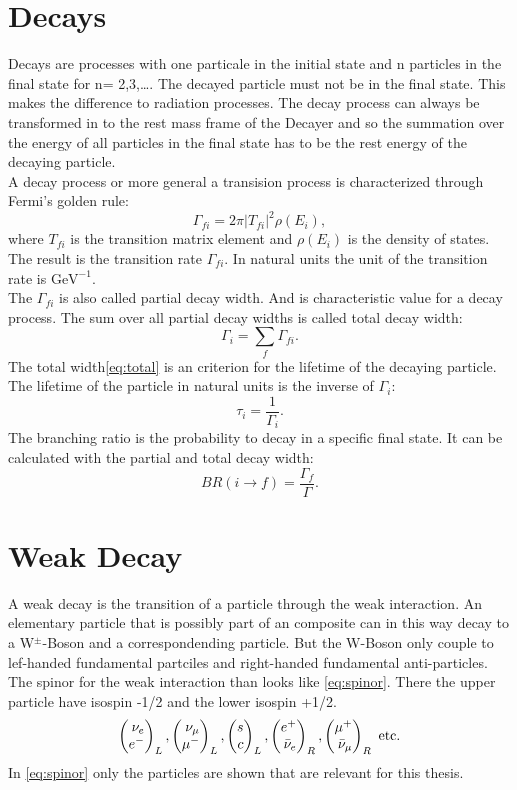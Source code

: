 \section{Decays}
Decays are processes with one particale in the initial state and n particles 
in the final state for n= 2,3,{\ldots}. The decayed particle must not be in the final 
state. This makes the difference to radiation processes. The decay process can 
always be transformed in to the rest mass frame of the Decayer and so the 
summation over the energy of all particles in the final state has to be the 
rest energy of the decaying particle.\\
A decay process or more general a transision process is characterized through 
Fermi's golden rule:
\begin{equation}
  \Gamma_{fi} = 2 \pi |T_{fi}|^2 \rho\left(E_i\right), \label{eq:fermi}
\end{equation}
where \(T_{fi}\) is the transition matrix element and 
\(\rho\left(E_i\right)\) is the density of states. The result is the transition 
rate \(\Gamma_{fi}\). In natural units the unit of the transition rate is \(\text{GeV}^{-1}\).\\
The \(\Gamma_{fi}\) is also called partial decay width. And is characteristic value 
for a decay process. The sum over all partial decay widths is called 
total decay width:
\begin{equation}
  \Gamma_i = \sum_f \Gamma_{fi}. \label{eq:total}
\end{equation}
The total width{\eqref{eq:total}} is an criterion for the lifetime of the 
decaying particle. The lifetime  of the particle in natural units is the 
inverse of \(\Gamma_i\):
\begin{equation}
  \tau_i = \frac{1}{\Gamma_i}. \label{eq:lifetime}
\end{equation}
The branching ratio is the probability to decay in a specific final 
state. It can be calculated with the partial and total decay width:
\begin{equation}
  BR( i \rightarrow f) = \frac{\Gamma_f}{\Gamma}. \label{eq:br}
\end{equation}

\section{Weak Decay}
A weak decay is the transition of a particle through the weak interaction. An 
elementary particle that is possibly part of an composite can in this 
way decay to a W\(^\pm\)-Boson and a correspondending particle. But the W-Boson only 
couple to lef-handed fundamental partciles and right-handed fundamental 
anti-particles. The spinor for the weak interaction than looks like 
{\eqref{eq:spinor}}. There the upper particle have isospin -1/2 and the lower isospin 
+1/2.
\begin{equation}
  \Spvek{\nu_e; e^-}_L,\Spvek{\nu_\mu; \mu^-}_L, \Spvek{s; c}_L, \Spvek{e^+; \bar{\nu}_e}_R, 
  \Spvek{\mu^+; \bar{\nu}_\mu}_R \text{ etc.} \label{eq:spinor}
\end{equation}
In {\eqref{eq:spinor}} only the particles are shown that are relevant for this 
thesis.

